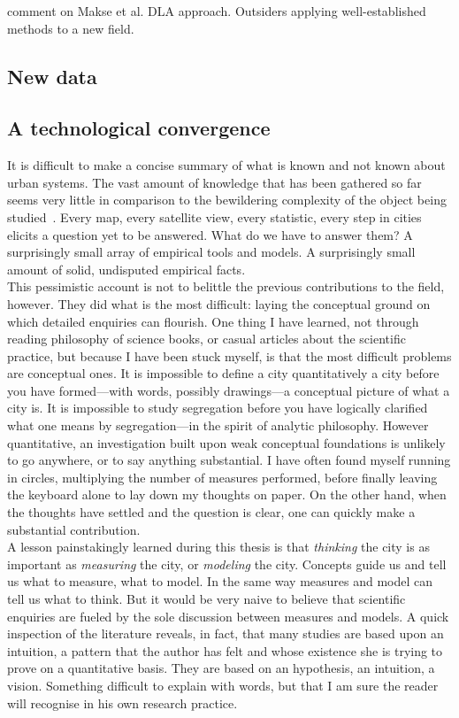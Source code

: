 \cite{Batty:1995} comment on Makse et al. DLA approach.
Outsiders applying well-established methods to a new field.
    \subsection{New data}
    \label{sub:new_data}
    
    \subsection{A technological convergence}
    \label{sub:a_technological_convergence} 

It is difficult to make a concise summary of what is known and not known about
urban systems. The vast amount of knowledge that has been gathered so far seems
very little in comparison to the bewildering complexity of the object being
studied~\cite{Batty:2008}. Every map, every satellite view, every statistic, every step
in cities elicits a question yet to be answered. What do we have to answer them?
A surprisingly small array of empirical tools and models. A surprisingly small
amount of solid, undisputed empirical facts.\\

This pessimistic account is not to belittle the previous contributions to the
field, however. They did what is the most difficult: laying the conceptual
ground on which detailed enquiries can flourish. One thing I have learned, not
through reading philosophy of science books, or casual articles about the
scientific practice, but because I have been stuck myself, is that the most
difficult problems are conceptual ones. It is impossible to define a city
quantitatively a city before you have formed---with words, possibly drawings---a
conceptual picture of what a city is. It is impossible to study segregation
before you have logically clarified what one means by segregation---in the
spirit of analytic philosophy. However quantitative, an investigation built upon
weak conceptual foundations is unlikely to go anywhere, or to say anything
substantial. I have often found myself running in circles, multiplying the
number of measures performed, before finally leaving the keyboard alone to lay
down my thoughts on paper. On the other hand, when the thoughts have settled and
the question is clear, one can quickly make a substantial contribution.\\

A lesson painstakingly learned during this thesis is that \emph{thinking} the
city is as important as \emph{measuring} the city, or \emph{modeling} the city.
Concepts guide us and tell us what to measure, what to model. In the same way
measures and model can tell us what to think. But it would be very naive to
believe that scientific enquiries are fueled by the sole discussion between
measures and models. A quick inspection of the literature reveals, in fact, that
many studies are based upon an intuition, a pattern that the author has felt and
whose existence she is trying to prove on a quantitative basis. They are based
on an hypothesis, an intuition, a vision. Something difficult to explain with
words, but that I am sure the reader will recognise in his own research
practice.

